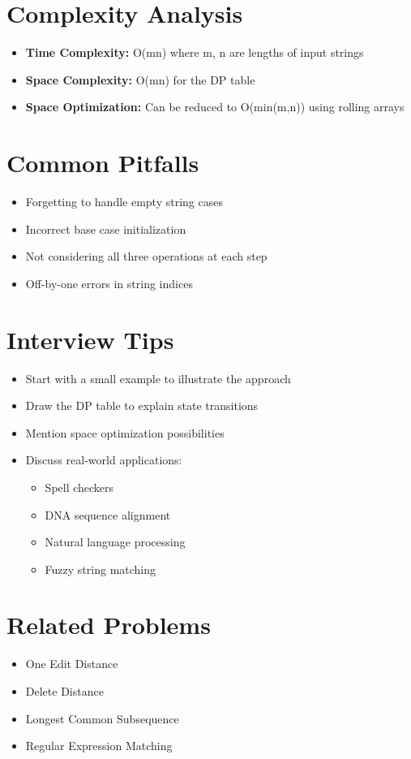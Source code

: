 \section*{Complexity Analysis}
\begin{itemize}
    \item \textbf{Time Complexity:} O(mn) where m, n are lengths of input strings
    \item \textbf{Space Complexity:} O(mn) for the DP table
    \item \textbf{Space Optimization:} Can be reduced to O(min(m,n)) using rolling arrays
\end{itemize}

\section*{Common Pitfalls}
\begin{itemize}
    \item Forgetting to handle empty string cases
    \item Incorrect base case initialization
    \item Not considering all three operations at each step
    \item Off-by-one errors in string indices
\end{itemize}

\section*{Interview Tips}
\begin{itemize}
    \item Start with a small example to illustrate the approach
    \item Draw the DP table to explain state transitions
    \item Mention space optimization possibilities
    \item Discuss real-world applications:
        \begin{itemize}
            \item Spell checkers
            \item DNA sequence alignment
            \item Natural language processing
            \item Fuzzy string matching
        \end{itemize}
\end{itemize}

\section*{Related Problems}
\begin{itemize}
    \item One Edit Distance
    \item Delete Distance
    \item Longest Common Subsequence
    \item Regular Expression Matching
\end{itemize}

\printindex
